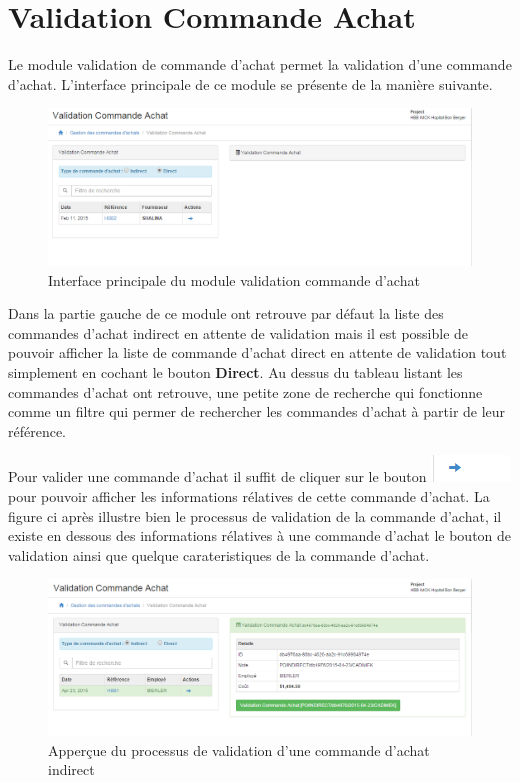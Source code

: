 \documentclass[12pt,a4paper]{report}
\begin{document}
\newpage
\section{Validation Commande Achat}
Le module validation de commande d'achat permet la validation d'une commande d'achat. L'interface principale de ce module se présente de la manière suivante.

\begin{figure}[h]
\begin{center}
\includegraphics[width=12cm]{pic/ValideComAchat.png}
\end{center}
\caption{Interface principale du module validation commande d'achat}
\label{Interface principale du module validation commande d'achat}
\end{figure}  

Dans la partie gauche de ce module ont retrouve par défaut la liste des commandes d'achat indirect en attente de validation mais il est possible de pouvoir afficher la liste de commande d'achat direct en attente de validation tout simplement en cochant le bouton \textbf{Direct}. Au dessus du tableau listant les commandes d'achat ont retrouve, une petite zone de recherche qui fonctionne comme un filtre qui permer de rechercher les commandes d'achat à partir de leur référence.

Pour valider une commande d'achat il suffit de cliquer sur le bouton \includegraphics[scale=0.7]{pic/BlueArrow.png} pour pouvoir afficher les informations rélatives de cette commande d'achat. La figure ci après illustre bien le processus de validation de la commande d'achat, il existe en dessous des informations rélatives à une commande d'achat le bouton de validation ainsi que quelque carateristiques de la commande d'achat.

\begin{figure}[h]
\begin{center}
\includegraphics[width=12cm]{pic/ValidationCommandeAchat.png}
\end{center}
\caption{Apperçue du processus de validation d'une commande d'achat indirect}
\label{Apperçue du processus de validation d'une commande d'achat indirect}
\end{figure} 
\end{document}
